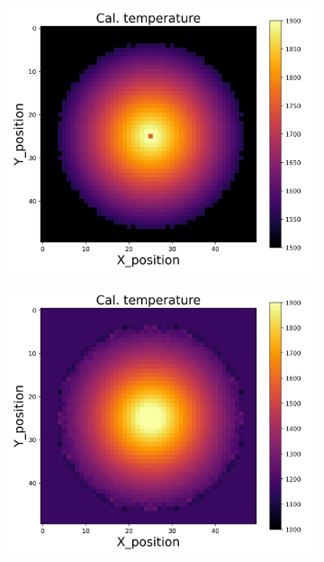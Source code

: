 {\begin{figure}[p]
\begin{minipage}{\textwidth}
\begin{subfigure}{0.325\textwidth}
        \end{subfigure}
        \begin{subfigure}{0.325\textwidth}
            \centering
            \includegraphics[width=\textwidth]{figures/raw_data/5/lin_square/T_cal.jpg}
        \end{subfigure}
        \begin{subfigure}{0.325\textwidth}
            \centering
            \includegraphics[width=\textwidth]{figures/raw_data/21/lin_square/T_cal.jpg}

\end{subfigure}
\end{minipage}
\end{figure}}
